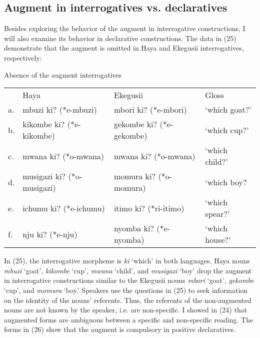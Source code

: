 \documentclass[output=paper]{langscibook}
\begin{document}
\subsection{Augment in interrogatives vs. declaratives}  
	Besides exploring the behavior of the augment in interrogative constructions, I will also examine its behavior in declarative constructions.  The data in (25) demonstrate that the augment is omitted in Haya and Ekegusii interrogatives, respectively:  

\begin{exe}
\ex Absence of the augment interrogatives\\
\label{hayagusii25}
\begin{tabular}{llll}
        &     Haya		&		Ekegusii	&		Gloss	\\	 
a. &	mbuzi ki? (*e-mbuzi)	&	mbori ki? (*e-mbori) &		‘which goat?’    \\		
b. &	kikombe ki? (*e-kikombe) &	gekombe ki? (*e-gekombe) &	‘which cup?’\\
c. &	mwana ki? (*o-mwana) &	mwana ki? (*o-mwana) &	‘which child?’	\\
d. &	musigazi ki? (*o-musigazi) &	momura ki? (*o-momura) &	‘which boy?\\
e. &	ichumu ki? (*e-ichumu) &	itimo ki? (*ri-itimo)	&	‘which spear?’ \\
f. &	nju ki?	(*e-nju)	&	nyomba ki? (*e-nyomba)&	‘which house?’ \\

\end{tabular}
\end{exe}
In (25), the interrogative morpheme is \textit{ki} ‘which’ in both languages. Haya nouns \textit{mbuzi} ‘goat’, \textit{kikombe} ‘cup’, \textit{mwana} ‘child’, and \textit{musigazi} ‘boy’ drop the augment in interrogative constructions similar to the Ekegusii nouns \textit{mbori} ‘goat’, \textit{gekombe} ‘cup’, and \textit{momura} ‘boy.' Speakers use the questions in (25) to seek information on the identity of the nouns’ referents. Thus, the referents of the non-augmented nouns are not known by the speaker, i.e. are non-specific. I showed in (24) that augmented forms are ambiguous between a specific and non-specific reading. The forms in (26) show that the augment is compulsory in positive declaratives. 
\end{document}
